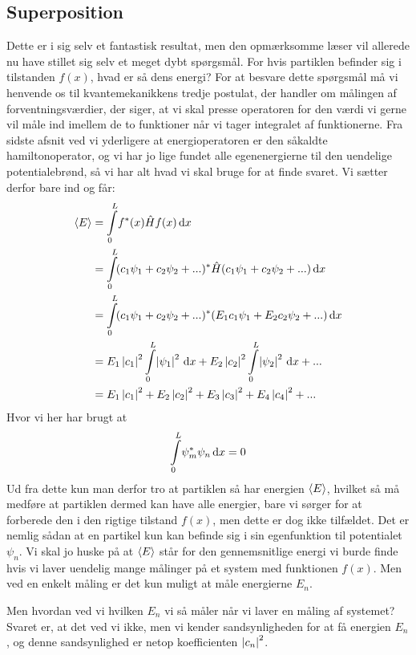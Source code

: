 \documentclass[../Kvantemekanik.tex]{subfiles}
\begin{document}
\subsection{Superposition}
Dette er i sig selv et fantastisk resultat, men den opmærksomme læser vil allerede nu have stillet sig selv et meget dybt spørgsmål. For hvis partiklen befinder sig i tilstanden $f(x)$, hvad er så dens energi? For at besvare dette spørgsmål må vi henvende os til kvantemekanikkens tredje postulat, der handler om målingen af forventningsværdier, der siger, at vi skal presse operatoren for den værdi vi gerne vil måle ind imellem de to funktioner når vi tager integralet af funktionerne. Fra sidste afsnit ved vi yderligere at energioperatoren er den såkaldte hamiltonoperator, og vi har jo lige fundet alle egenenergierne til den uendelige potentialebrønd, så vi har alt hvad vi skal bruge for at finde svaret. Vi sætter derfor bare ind og får:
\begin{align}
    \expect E&=\integral{f^*(x)\op H f(x)}{x}{0}{L}\nonumber\\
    &=\integral{(c_1\psi_1+c_2\psi_2+...)^{*}\hat{H}(c_1\psi_1+c_2\psi_2+...)}{x}{0}{L}\nonumber\\
    &=\integral{(c_1\psi_1+c_2\psi_2+...)^{*}(E_1c_1\psi_1+E_2c_2\psi_2+...)}{x}{0}{L}\nonumber\\
    &=E_1\abs{c_1}^2\integral{\abs{\psi_1}^2}{x}{0}{L}+E_2\abs{c_2}^2\integral{\abs{\psi_2}^2}{x}{0}{L}+...\nonumber\\
    &=E_1\abs{c_1}^2+E_2\abs{c_2}^2+E_3\abs{c_3}^2+E_4\abs{c_4}^2+...\label{eq:kvant:frovE}
\end{align}
Hvor vi her har brugt at 
$$ \integral{\psi_{m}^{*}\psi_n}{x}{0}{L}=0$$
Ud fra dette kun man derfor tro at partiklen så har energien $\expect E$, hvilket så må medføre at partiklen dermed kan have alle energier, bare vi sørger for at forberede den i den rigtige tilstand $f(x)$, men dette er dog ikke tilfældet.
Det er nemlig sådan at en partikel kun kan befinde sig i sin egenfunktion til potentialet $\psi_n$. Vi skal jo huske på at $\expect E$ står for den gennemsnitlige energi vi burde finde hvis vi laver uendelig mange målinger på et system med funktionen $f(x)$. Men ved en enkelt måling er det kun muligt at måle energierne $E_n$.

Men hvordan ved vi hvilken $E_n$ vi så måler når vi laver en måling af systemet? Svaret er, at det ved vi ikke, men vi kender sandsynligheden for at få energien $E_n$, og denne sandsynlighed er netop koefficienten $\abs{c_n}^2$. 
\end{document}
